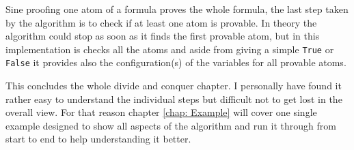 Sine proofing one atom of a formula proves the whole formula, the last step taken by the algorithm is to check if at least one atom is provable. In theory the algorithm could stop as soon as it finds the first provable atom, but in this implementation is checks all the atoms and aside from giving a simple \texttt{True} or \texttt{False} it provides also the configuration(s) of the variables for all provable atoms.



\bigskip
\par This concludes the whole divide and conquer chapter. I personally have found it rather easy to understand the individual steps but difficult not to get lost in the overall view. For that reason chapter \ref{chap: Example} will cover one single example designed to show all aspects of the algorithm and run it through from start to end to help understanding it better.

